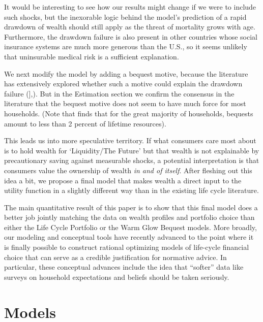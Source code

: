 \documentclass{article}
\begin{document}
It would be interesting to see how our results might change if we were to include such shocks, but the inexorable logic behind the model's prediction of a rapid drawdown of wealth should still apply as the threat of mortality grows with age.
Furthermore, the drawdown failure is also present in other countries whose social insurance systems are much more generous than the U.S., so it seems unlikely that uninsurable medical risk is a sufficient explanation.

We next modify the model by adding a bequest motive, because the literature has extensively explored whether such a motive could explain the drawdown failure (\href{@deNardi2004}{}],\cite{DeNardi2016d}).
But in the Estimation section we confirm the consensus in the literature that the bequest motive does not seem to have much force for most households.
(Note that \cite{Hendricks_2002} finds that for the great majority of households, bequests amount to less than 2 percent of lifetime resources).

This leads us into more speculative territory.
If what consumers care most about is to hold wealth for `Liquidity/The Future' but that wealth is not explainable by precautionary saving against measurable shocks, a potential interpretation is that consumers value the ownership of wealth \textit{in and of itself}.
After fleshing out this idea a bit, we propose a final model that makes wealth a direct input to the utility function in a slightly different way than in the existing life cycle literature.

The main quantitative result of this paper is to show that this final model does a better job jointly matching the data on wealth profiles and portfolio choice than either the Life Cycle Portfolio or the Warm Glow Bequest models.
More broadly, our modeling and conceptual tools have recently advanced to the point where it is finally possible to construct rational optimizing models of life-cycle financial choice that can serve as a credible justification for normative advice.
In particular, these conceptual advances include the idea that ``softer'' data like surveys on household expectations and beliefs should be taken seriously.

\section{Models}
\end{document}
